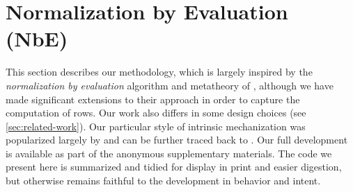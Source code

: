 \documentclass[sigplan,10pt,anonymous,review]{acmart}\settopmatter{printfolios=true,printccs=false,printacmref=false}
\begin{document}







\section{Normalization by Evaluation (NbE)}
This section describes our methodology, which is largely inspired by the \emph{normalization by evaluation} algorithm and metatheory of \citet{ChapmanKNW19}, although we have made significant extensions to their approach in order to capture the computation of rows. Our work also differs in some design choices (see \cref{sec:related-work}). Our particular style of intrinsic mechanization was popularized largely by \citet{plfa22} and can be further traced back to \citet{AltenkirchB99}. Our full development is available as part of the anonymous supplementary materials. The code we present here is summarized and tidied for display in print and easier digestion, but otherwise remains faithful to the development in behavior and intent. 
\end{document}
